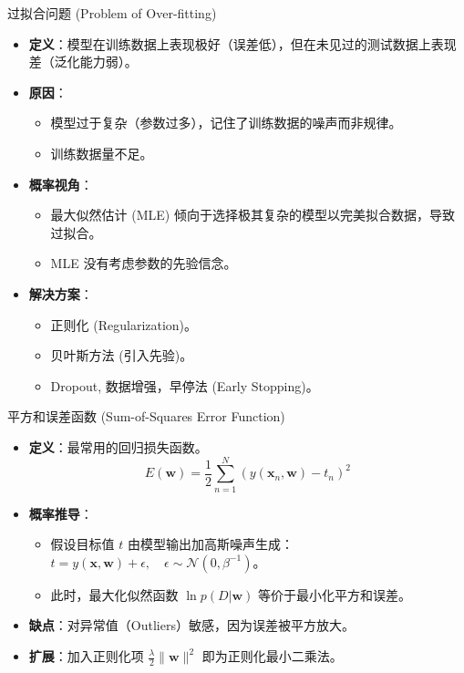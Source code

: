 \documentclass[12pt, aspectratio=169]{beamer}
\newcommand{\vect}[1]{\mathbf{#1}}
\newcommand{\N}{\mathcal{N}}
\begin{document}
\begin{frame}{过拟合问题 (Problem of Over-fitting)}
    \begin{itemize}
        \item \textbf{定义}：模型在训练数据上表现极好（误差低），但在未见过的测试数据上表现差（泛化能力弱）。
        \item \textbf{原因}：
        \begin{itemize}
            \item 模型过于复杂（参数过多），记住了训练数据的噪声而非规律。
            \item 训练数据量不足。
        \end{itemize}
        \item \textbf{概率视角}：
        \begin{itemize}
            \item 最大似然估计 (MLE) 倾向于选择极其复杂的模型以完美拟合数据，导致过拟合。
            \item MLE 没有考虑参数的先验信念。
        \end{itemize}
        \item \textbf{解决方案}：
        \begin{itemize}
            \item 正则化 (Regularization)。
            \item 贝叶斯方法 (引入先验)。
            \item Dropout, 数据增强，早停法 (Early Stopping)。
        \end{itemize}
    \end{itemize}
\end{frame}

\begin{frame}{平方和误差函数 (Sum-of-Squares Error Function)}
    \begin{itemize}
        \item \textbf{定义}：最常用的回归损失函数。
        $$ E(\vect{w}) = \frac{1}{2} \sum_{n=1}^N (y(\vect{x}_n, \vect{w}) - t_n)^2 $$
        \item \textbf{概率推导}：
        \begin{itemize}
            \item 假设目标值 $t$ 由模型输出加高斯噪声生成：$t = y(\vect{x}, \vect{w}) + \epsilon, \quad \epsilon \sim \N(0, \beta^{-1})$。
            \item 此时，最大化似然函数 $\ln p(D|\vect{w})$ 等价于最小化平方和误差。
        \end{itemize}
        \item \textbf{缺点}：对异常值（Outliers）敏感，因为误差被平方放大。
        \item \textbf{扩展}：加入正则化项 $\frac{\lambda}{2}\|\vect{w}\|^2$ 即为正则化最小二乘法。
    \end{itemize}
\end{frame}
\end{document}
